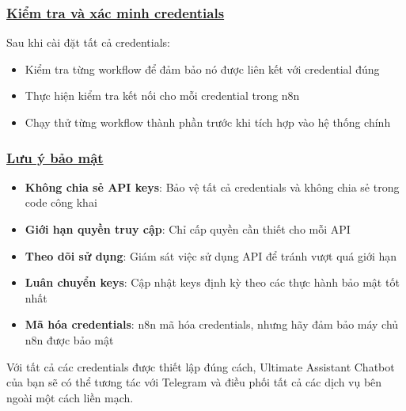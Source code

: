 \subsubsection{\underline{Kiểm tra và xác minh credentials}}
Sau khi cài đặt tất cả credentials:
\begin{itemize}
    \item Kiểm tra từng workflow để đảm bảo nó được liên kết với credential đúng
    \item Thực hiện kiểm tra kết nối cho mỗi credential trong n8n
    \item Chạy thử từng workflow thành phần trước khi tích hợp vào hệ thống chính
\end{itemize}

\subsubsection{\underline{Lưu ý bảo mật}}
\begin{itemize}
    \item \textbf{Không chia sẻ API keys}: Bảo vệ tất cả credentials và không chia sẻ trong code công khai
    \item \textbf{Giới hạn quyền truy cập}: Chỉ cấp quyền cần thiết cho mỗi API
    \item \textbf{Theo dõi sử dụng}: Giám sát việc sử dụng API để tránh vượt quá giới hạn
    \item \textbf{Luân chuyển keys}: Cập nhật keys định kỳ theo các thực hành bảo mật tốt nhất
    \item \textbf{Mã hóa credentials}: n8n mã hóa credentials, nhưng hãy đảm bảo máy chủ n8n được bảo mật
\end{itemize}

Với tất cả các credentials được thiết lập đúng cách, Ultimate Assistant Chatbot của bạn sẽ có thể tương tác với Telegram và điều phối tất cả các dịch vụ bên ngoài một cách liền mạch.